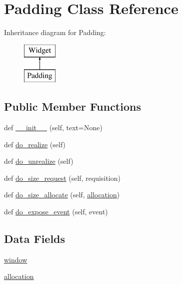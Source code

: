 \hypertarget{classpadding_1_1_padding}{}\section{Padding Class Reference}
\label{classpadding_1_1_padding}
Inheritance diagram for Padding\+:\begin{figure}[H]
\begin{center}
\leavevmode
\includegraphics[height=2.000000cm]{classpadding_1_1_padding}
\end{center}
\end{figure}
\subsection*{Public Member Functions}
\begin{DoxyCompactItemize}
\item 
def \hyperlink{classpadding_1_1_padding_a9a6d706ad05cb94992492f5b9ef0c450}{\+\_\+\+\_\+init\+\_\+\+\_\+} (self, text=None)
\item 
def \hyperlink{classpadding_1_1_padding_acbcf633d6b24a3e818c168fe5ec6ef04}{do\+\_\+realize} (self)
\item 
def \hyperlink{classpadding_1_1_padding_a062833f2fdcd76c59e720632782ce086}{do\+\_\+unrealize} (self)
\item 
def \hyperlink{classpadding_1_1_padding_a3306e45c6b3b906dffe468ab31ddacf3}{do\+\_\+size\+\_\+request} (self, requisition)
\item 
def \hyperlink{classpadding_1_1_padding_aeecd5f975520316f3861bbdf3dc25b31}{do\+\_\+size\+\_\+allocate} (self, \hyperlink{classpadding_1_1_padding_a95abc93277d25eecef5c7599dfa4b330}{allocation})
\item 
def \hyperlink{classpadding_1_1_padding_a3568b624c8d5e9dd63c9073dfab5d1b4}{do\+\_\+expose\+\_\+event} (self, event)
\end{DoxyCompactItemize}
\subsection*{Data Fields}
\begin{DoxyCompactItemize}
\item 
\hyperlink{classpadding_1_1_padding_a04a8a2bbfa9c15500892b8e5033d625b}{window}
\item 
\hyperlink{classpadding_1_1_padding_a95abc93277d25eecef5c7599dfa4b330}{allocation}
\end{DoxyCompactItemize}


